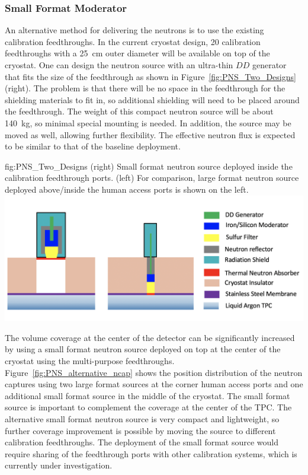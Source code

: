 \label{sec:dp-calib-pns-alt}

\subsubsection{Small Format Moderator}
An alternative method for delivering the neutrons is to use the existing calibration feedthroughs. In the current cryostat design, \num{20} calibration feedthroughs with a \SI{25}{\cm} outer diameter will be available on top of the cryostat. One can design the neutron source with an ultra-thin $DD$ generator that fits the size of the feedthrough as shown in Figure~\ref{fig:PNS_Two_Designs} (right). The problem is that there will be no space in the feedthrough for the shielding materials to fit in, so additional shielding will need to be placed around the feedthrough. The weight of this compact neutron source will be about \SI{140}{\kg}, so minimal special mounting is needed. In addition, the source may be moved as well, allowing further flexibility. The effective neutron flux is expected to be similar to that of the baseline deployment. 

\begin{dunefigure}{fig:PNS_Two_Designs}
{(right) Small format neutron source deployed inside the calibration feedthrough ports. (left) For comparison, large format neutron source deployed above/inside the human access ports is shown on the left.}
\includegraphics[width=16cm]{graphics/PNS_Moderator_Combined.png}
\end{dunefigure}

The volume coverage at the center of the detector can be significantly increased by using a small format neutron source deployed on top at the center of the cryostat using the multi-purpose feedthroughs.  
Figure~\ref{fig:PNS_alternative_ncap} shows the position distribution of the neutron captures using two large format sources at the corner human access ports and one additional small format source in the middle of the cryostat. The small format source is %
important to complement the coverage at the center of the TPC. The alternative small format neutron source is very compact and lightweight, so further coverage improvement is possible by moving the source to different calibration feedthroughs. The deployment of the small format source would require sharing of the feedthrough ports with other calibration systems, which is currently under investigation.

